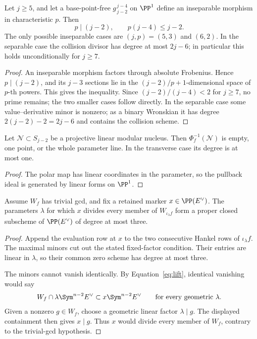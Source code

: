 \begin{lemma}
\label{supp:lem:uniform-collision}%
%
Let \(j\geq5\), and let a base-point-free
\(g^{\,j-4}_{\,j-2}\) on \(\PP^1\) define an inseparable morphism in
characteristic \(p\).  Then
\[
 p\mid(j-2),\qquad p(j-4)\leq j-2.
\]
The only possible inseparable cases are \((j,p)=(5,3)\) and
\((6,2)\).  In the separable case the collision divisor has degree at
most \(2j-6\); in particular this holds unconditionally for \(j\geq7\).
\end{lemma}

\begin{proof}
An inseparable morphism factors through absolute Frobenius.  Hence
\(p\mid(j-2)\), and its \(j-3\) sections lie in the
\((j-2)/p+1\)-dimensional space of \(p\)-th powers.  This gives the
inequality.  Since \((j-2)/(j-4)<2\) for \(j\geq7\), no prime remains;
the two smaller cases follow directly.  In the separable case some
value--derivative minor is nonzero; as a binary Wronskian it has degree
\(2(j-2)-2=2j-6\) and contains the collision scheme.
\end{proof}

\begin{lemma}
\label{supp:lem:linear-modular-pullback}%
%
%
Let \(\mathcal N\subset S_{j-2}\) be a projective linear modular
nucleus.  Then \(\Phi_f^{-1}(\mathcal N)\) is empty, one point, or the
whole parameter line.  In the transverse case its degree is at most
one.
\end{lemma}

\begin{proof}
The polar map has linear coordinates in the parameter, so the
pullback ideal is generated by linear forms on \(\PP^1\).
\end{proof}

\begin{lemma}
\label{supp:lem:old-marker-fixed-factor}%
%
Assume \(W_f\) has trivial gcd, and fix a retained marker
\(x\in\PP(E^\vee)\).  The parameters \(\lambda\) for which \(x\)
divides every member of \(W_{\iota_\lambda f}\) form a proper closed
subscheme of \(\PP(E^\vee)\) of degree at most three.
\end{lemma}

\begin{proof}
Append the evaluation row at \(x\) to the two consecutive Hankel rows
of \(\iota_\lambda f\).  The maximal minors cut out the stated
fixed-factor condition.  Their entries are linear in \(\lambda\), so
their common zero scheme has degree at most three.

The minors cannot vanish identically.  By
Equation~\eqref{eq:lift}, identical vanishing would say
\[
 W_f\cap\lambda\Sym^{n-2}E^\vee
       \subset x\Sym^{n-2}E^\vee
 \qquad\text{for every geometric }\lambda.
\]
Given a nonzero \(g\in W_f\), choose a geometric linear factor
\(\lambda\mid g\).  The displayed containment then gives \(x\mid g\).
Thus \(x\) would divide every member of \(W_f\), contrary to the
trivial-gcd hypothesis.
\end{proof}

